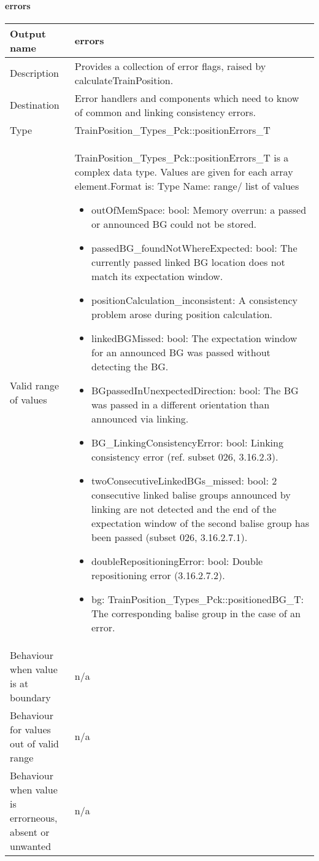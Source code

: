 \paragraph{errors}

\begin{longtable}{p{}p{}}
\toprule
Output name				& errors \\

\midrule
Description				& Provides a collection of error flags, raised by calculateTrainPosition.  \newline
  \\
\midrule
Destination				& Error handlers and components which need to know of common and linking consistency errors.  \\ 
\midrule
Type					& TrainPosition\_Types\_Pck::positionErrors\_T \\  
\midrule
Valid range of values	& TrainPosition\_Types\_Pck::positionErrors\_T is a complex data type. Values are given for each array element.\newline Format is: Type Name: range/ list of values
\begin{itemize}
\item outOfMemSpace: bool: Memory overrun: a passed or announced BG could not be stored.
\item passedBG\_foundNotWhereExpected: bool: The currently passed linked BG location does not match its expectation window.
\item positionCalculation\_inconsistent: A consistency problem arose during position calculation.
\item linkedBGMissed: bool: The expectation window for an announced BG was passed without detecting the BG.
\item BGpassedInUnexpectedDirection: bool: The BG was passed in a different orientation than announced via linking.
\item BG\_LinkingConsistencyError: bool: Linking consistency error (ref. subset 026, 3.16.2.3).
\item twoConsecutiveLinkedBGs\_missed: bool: 2 consecutive linked balise groups announced by linking are not detected and the end of the expectation window of the second balise group has been passed (subset 026, 3.16.2.7.1).
\item doubleRepositioningError: bool: Double repositioning error (3.16.2.7.2).
\item bg: TrainPosition\_Types\_Pck::positionedBG\_T: The corresponding balise group in the case of an error.

\end{itemize}  \\

\midrule
Behaviour when value is at boundary	& n/a \\
\midrule
Behaviour for values out of valid range	& n/a \\

\midrule
Behaviour when value is errorneous, absent or unwanted & n/a \\

\bottomrule
\end{longtable}

